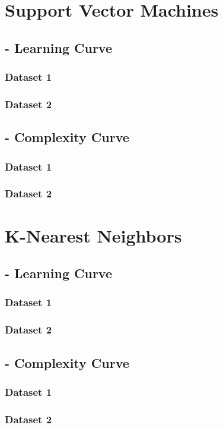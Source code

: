 \documentclass[letterpaper,12pt]{article}
\begin{document}
\section*{Support Vector Machines}
\subsection*{- Learning Curve}
\subsubsection*{	Dataset 1}
\subsubsection*{	Dataset 2}

\subsection*{- Complexity Curve}
\subsubsection*{	Dataset 1}
\subsubsection*{	Dataset 2}

\section*{K-Nearest Neighbors}
\subsection*{- Learning Curve}
\subsubsection*{	Dataset 1}
\subsubsection*{	Dataset 2}

\subsection*{- Complexity Curve}
\subsubsection*{	Dataset 1}
\subsubsection*{	Dataset 2}
\end{document}
